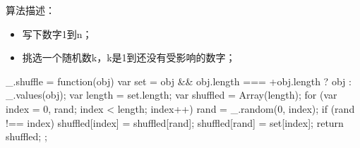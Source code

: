 算法描述：
\begin{itemize}
\item 写下数字1到n；
\item 挑选一个随机数k，k是1到还没有受影响的数字；
\
\end{itemize}

\begin{JavaScript}
  _.shuffle = function(obj) {
    var set = obj && obj.length === +obj.length ? obj : _.values(obj);
    var length = set.length;
    var shuffled = Array(length);
    for (var index = 0, rand; index < length; index++) {
      rand = _.random(0, index);
      if (rand !== index) shuffled[index] = shuffled[rand];
      shuffled[rand] = set[index];
    }
    return shuffled;
  };
\end{JavaScript}

